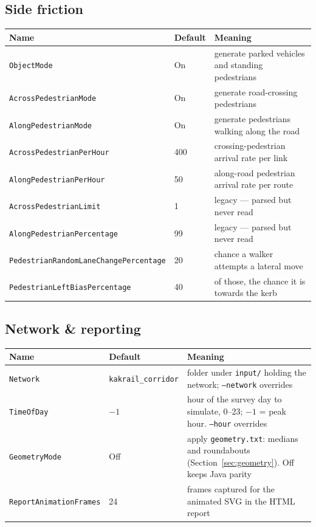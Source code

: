 \documentclass[11pt, a4paper]{article}
\newcommand{\code}[1]{\texttt{#1}}
\begin{document}
\subsection{Side friction}
\begin{tabularx}{\textwidth}{l l X}
\toprule
\textbf{Name} & \textbf{Default} & \textbf{Meaning} \\
\midrule
\code{ObjectMode} & On & generate parked vehicles and standing pedestrians \\
\code{AcrossPedestrianMode} & On & generate road-crossing pedestrians \\
\code{AlongPedestrianMode} & On & generate pedestrians walking along the road \\
\code{AcrossPedestrianPerHour} & 400 & crossing-pedestrian arrival rate per link \\
\code{AlongPedestrianPerHour} & 50 & along-road pedestrian arrival rate per route \\
\code{AcrossPedestrianLimit} & 1 & legacy --- parsed but never read \\
\code{AlongPedestrianPercentage} & 99 & legacy --- parsed but never read \\
\code{PedestrianRandomLaneChangePercentage} & 20 & chance a walker attempts a lateral move \\
\code{PedestrianLeftBiasPercentage} & 40 & of those, the chance it is towards the kerb \\
\bottomrule
\end{tabularx}

\subsection{Network \& reporting}
\begin{tabularx}{\textwidth}{l l X}
\toprule
\textbf{Name} & \textbf{Default} & \textbf{Meaning} \\
\midrule
\code{Network} & \code{kakrail\_corridor} & folder under \code{input/} holding the network; \code{--network} overrides \\
\code{TimeOfDay} & $-1$ & hour of the survey day to simulate, 0--23; $-1$ = peak hour. \code{--hour} overrides \\
\code{GeometryMode} & Off & apply \code{geometry.txt}: medians and roundabouts (Section~\ref{sec:geometry}). Off keeps Java parity \\
\code{ReportAnimationFrames} & 24 & frames captured for the animated SVG in the HTML report \\
\bottomrule
\end{tabularx}
\end{document}
